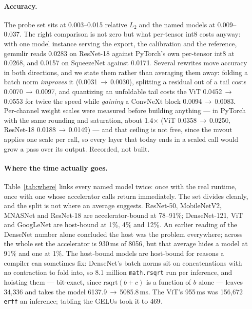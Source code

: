 \documentclass[runningheads]{llncs}
\begin{document}
\paragraph{Accuracy.} The probe set sits at 0.003--0.015 relative $L_2$ and the named models at
0.009--0.037. The right comparison is not zero but what per-tensor int8 costs
anyway: with one model instance serving the export, the calibration and the
reference, gemmlir reads 0.0283 on ResNet-18 against PyTorch's own per-tensor int8
at 0.0268, and 0.0157 on SqueezeNet against 0.0171. Several rewrites move accuracy
in both directions, and we state them rather than averaging them away: folding a
batch norm \emph{improves} it (0.0031\,$\to$\,0.0030), splitting a residual out of
a tail costs 0.0070\,$\to$\,0.0097, and quantizing an unfoldable tail costs the ViT
0.0452\,$\to$\,0.0553 for twice the speed while \emph{gaining} a ConvNeXt block
0.0094\,$\to$\,0.0083. Per-channel weight scales were measured before building
anything --- in PyTorch with the same rounding and saturation, about 1.4$\times$
(ViT 0.0358\,$\to$\,0.0250, ResNet-18 0.0188\,$\to$\,0.0149) --- and that ceiling
is not free, since the mvout applies one scale per call, so every layer that today
ends in a scaled call would grow a pass over its output. Recorded, not built.

\paragraph{Where the time actually goes.} Table~\ref{tab:where} links every named
model twice: once with the real runtime, once with one whose accelerator calls
return immediately. The set divides cleanly, and the split is not where an average
suggests. ResNet-50, MobileNetV2, MNASNet and ResNet-18 are accelerator-bound at
78--91\%; DenseNet-121, ViT and GoogLeNet are host-bound at 1\%, 4\% and 12\%. An
earlier reading of the DenseNet number alone concluded the host was the problem
everywhere; across the whole set the accelerator is 930\,ms of 8056, but that
average hides a model at 91\% and one at 1\%. The host-bound models are host-bound for
reasons a compiler can sometimes fix: DenseNet's batch norms sit on concatenations
with no contraction to fold into, so 8.1 million \texttt{math.rsqrt} run per
inference, and hoisting them --- bit-exact, since $\mathrm{rsqrt}(b+c)$ is a
function of $b$ alone --- leaves 34{,}336 and takes the model
6137.9\,$\to$\,5085.8\,ms. The ViT's 955\,ms was 156{,}672 \texttt{erff} an
inference; tabling the GELUs took it to 469.
\end{document}
